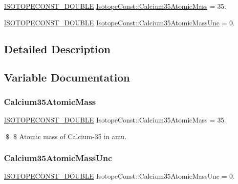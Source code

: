 \begin{DoxyCompactItemize}
\item 
\mbox{\hyperlink{group___isotope_const-_macros_ga8f45a7272ce02c0b4c65c44636ed719a}{I\+S\+O\+T\+O\+P\+E\+C\+O\+N\+S\+T\+\_\+\+D\+O\+U\+B\+LE}} \mbox{\hyperlink{group___isotope_const-_calcium-_ca35_gaad587f6c762db8684475dfa773dee031}{Isotope\+Const\+::\+Calcium35\+Atomic\+Mass}} = 35.
\item 
\mbox{\hyperlink{group___isotope_const-_macros_ga8f45a7272ce02c0b4c65c44636ed719a}{I\+S\+O\+T\+O\+P\+E\+C\+O\+N\+S\+T\+\_\+\+D\+O\+U\+B\+LE}} \mbox{\hyperlink{group___isotope_const-_calcium-_ca35_ga2cd4021fba6129a1bc1bd42f1a45946e}{Isotope\+Const\+::\+Calcium35\+Atomic\+Mass\+Unc}} = 0.
\end{DoxyCompactItemize}


\subsection{Detailed Description}


\subsection{Variable Documentation}
\mbox{\label{group___isotope_const-_calcium-_ca35_gaad587f6c762db8684475dfa773dee031}} 
\subsubsection{\texorpdfstring{Calcium35\+Atomic\+Mass}{Calcium35AtomicMass}}
{\footnotesize\ttfamily \mbox{\hyperlink{group___isotope_const-_macros_ga8f45a7272ce02c0b4c65c44636ed719a}{I\+S\+O\+T\+O\+P\+E\+C\+O\+N\+S\+T\+\_\+\+D\+O\+U\+B\+LE}} Isotope\+Const\+::\+Calcium35\+Atomic\+Mass = 35.}

\$ \$ Atomic mass of Calcium-\/35 in amu. \mbox{\label{group___isotope_const-_calcium-_ca35_ga2cd4021fba6129a1bc1bd42f1a45946e}} 
\subsubsection{\texorpdfstring{Calcium35\+Atomic\+Mass\+Unc}{Calcium35AtomicMassUnc}}
{\footnotesize\ttfamily \mbox{\hyperlink{group___isotope_const-_macros_ga8f45a7272ce02c0b4c65c44636ed719a}{I\+S\+O\+T\+O\+P\+E\+C\+O\+N\+S\+T\+\_\+\+D\+O\+U\+B\+LE}} Isotope\+Const\+::\+Calcium35\+Atomic\+Mass\+Unc = 0.}

